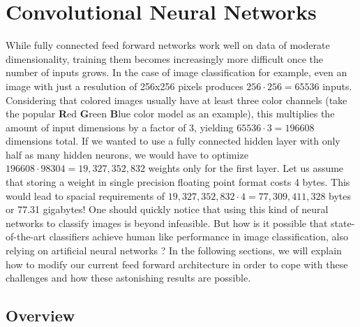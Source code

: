 \chapter{Convolutional Neural Networks}
\label{sec:convnets}

While fully connected feed forward networks work well on data of
moderate dimensionality, training them becomes increasingly more
difficult once the number of inputs grows. In the case of image
classification for example, even an image with just a resulution of
256x256 pixels produces \(256 \cdot 256 = 65536\) inputs. Considering
that colored images usually have at least three color channels (take
the popular \textbf{R}ed \textbf{G}reen \textbf{B}lue color model as
an example), this multiplies the amount of input dimensions by a
factor of 3, yielding \(65536 \cdot 3 = 196608\) dimensions total. If
we wanted to use a fully connected hidden layer with only half as many
hidden neurons, we would have to optimize \(196608 \cdot 98304 =
19,327,352,832\) weights only for the first layer. Let us assume that
storing a weight in single precision floating point format
costs 4 bytes. This
would lead to spacial requirements of \(19,327,352,832 \cdot 4 =
77,309,411,328\) bytes or 77.31 gigabytes! One should quickly notice
that using this kind of neural networks to classify images is beyond
infeasible. But how is it possible that state-of-the-art classifiers
achieve human like performance in image classification, also
relying on artificial neural networks \cite{Russakovsky}? In the
following sections, we will explain how to modify our current feed
forward architecture in order to cope with these challenges and how
these astonishing results are possible.

\section{Overview}
\label{sec:conv-overview}

